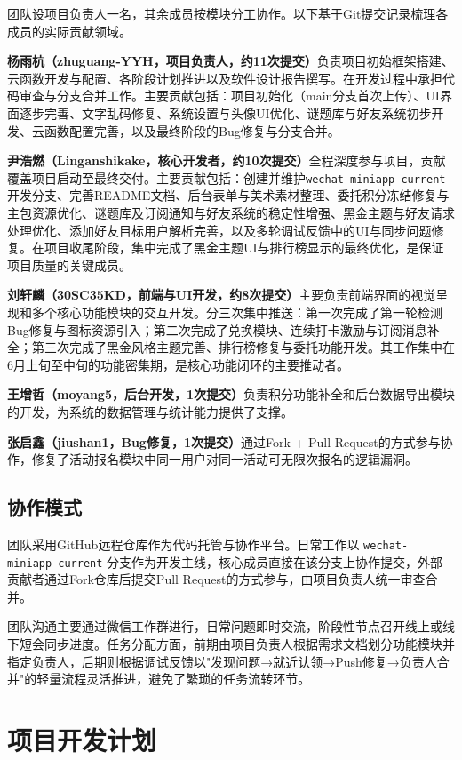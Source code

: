 \documentclass[a4paper,12pt]{article}
\begin{document}
团队设项目负责人一名，其余成员按模块分工协作。以下基于Git提交记录梳理各成员的实际贡献领域。

\textbf{杨雨杭（zhuguang-YYH，项目负责人，约11次提交）}负责项目初始框架搭建、云函数开发与配置、各阶段计划推进以及软件设计报告撰写。在开发过程中承担代码审查与分支合并工作。主要贡献包括：项目初始化（main分支首次上传）、UI界面逐步完善、文字乱码修复、系统设置与头像UI优化、谜题库与好友系统初步开发、云函数配置完善，以及最终阶段的Bug修复与分支合并。

\textbf{尹浩燃（Linganshikake，核心开发者，约10次提交）}全程深度参与项目，贡献覆盖项目启动至最终交付。主要贡献包括：创建并维护\texttt{wechat-miniapp-current}开发分支、完善README文档、后台表单与美术素材整理、委托积分冻结修复与主包资源优化、谜题库及订阅通知与好友系统的稳定性增强、黑金主题与好友请求处理优化、添加好友目标用户解析完善，以及多轮调试反馈中的UI与同步问题修复。在项目收尾阶段，集中完成了黑金主题UI与排行榜显示的最终优化，是保证项目质量的关键成员。

\textbf{刘轩麟（30SC35KD，前端与UI开发，约8次提交）}主要负责前端界面的视觉呈现和多个核心功能模块的交互开发。分三次集中推送：第一次完成了第一轮检测Bug修复与图标资源引入；第二次完成了兑换模块、连续打卡激励与订阅消息补全；第三次完成了黑金风格主题完善、排行榜修复与委托功能开发。其工作集中在6月上旬至中旬的功能密集期，是核心功能闭环的主要推动者。

\textbf{王增哲（moyang5，后台开发，1次提交）}负责积分功能补全和后台数据导出模块的开发，为系统的数据管理与统计能力提供了支撑。

\textbf{张启鑫（jiushan1，Bug修复，1次提交）}通过Fork + Pull Request的方式参与协作，修复了活动报名模块中同一用户对同一活动可无限次报名的逻辑漏洞。

\subsection{协作模式}

团队采用GitHub远程仓库作为代码托管与协作平台。日常工作以 \texttt{wechat-miniapp-current} 分支作为开发主线，核心成员直接在该分支上协作提交，外部贡献者通过Fork仓库后提交Pull Request的方式参与，由项目负责人统一审查合并。

团队沟通主要通过微信工作群进行，日常问题即时交流，阶段性节点召开线上或线下短会同步进度。任务分配方面，前期由项目负责人根据需求文档划分功能模块并指定负责人，后期则根据调试反馈以"发现问题→就近认领→Push修复→负责人合并"的轻量流程灵活推进，避免了繁琐的任务流转环节。

\section{项目开发计划}
\end{document}
